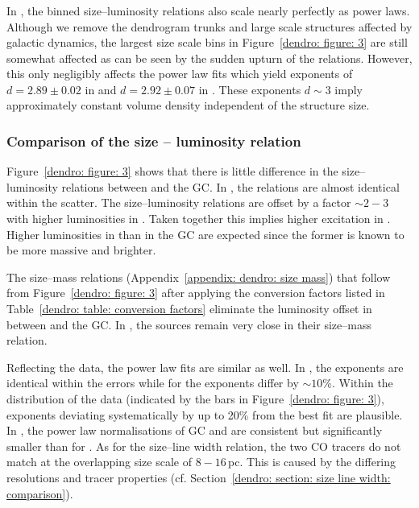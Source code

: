 
\subsubsection{}
\label{dendro: section: size luminosity: ngc253}

In , the binned size--luminosity relations also scale nearly perfectly as power laws.
Although we remove the dendrogram trunks and large scale structures affected by galactic dynamics, the largest size scale bins in Figure~\ref{dendro: figure: 3} are still somewhat affected as can be seen by the sudden upturn of the relations. However, this only negligibly affects the power law fits which yield exponents of $d=2.89 \pm 0.02$ in  and $d=2.92 \pm 0.07$ in .
These exponents $d \sim 3$ imply approximately constant volume density independent of the structure size.


\subsubsection{Comparison of the size -- luminosity relation}
\label{dendro: section: size luminosity: comparison}

Figure~\ref{dendro: figure: 3} shows that there is little difference in the size--luminosity relations between  and the GC.
In , the relations are almost identical within the scatter. The  size--luminosity relations are offset by a factor $\sim 2-3$ with higher luminosities in . 
Taken together this implies higher excitation in .
Higher luminosities in  than in the GC are expected since the former is known to be more massive and brighter.

The size--mass relations (Appendix~\ref{appendix: dendro: size mass}) that follow from Figure~\ref{dendro: figure: 3} after applying the conversion factors listed in Table~\ref{dendro: table: conversion factors} eliminate the luminosity offset in  between  and the GC. In , the sources remain very close in their size--mass relation.

Reflecting the data, the power law fits are similar as well. In , the exponents are identical within the errors while for  the exponents differ by $\sim10$\%. Within the distribution of the data (indicated by the bars in Figure~\ref{dendro: figure: 3}), exponents deviating systematically by up to 20\% from the best fit are plausible.
In , the power law normalisations \Lten of GC and  are consistent but significantly smaller than for .
As for the size--line width relation, the two CO tracers do not match at the overlapping size scale of $8-16$\,pc. This is caused by the differing resolutions and tracer properties (cf. Section~\ref{dendro: section: size line width: comparison}).

